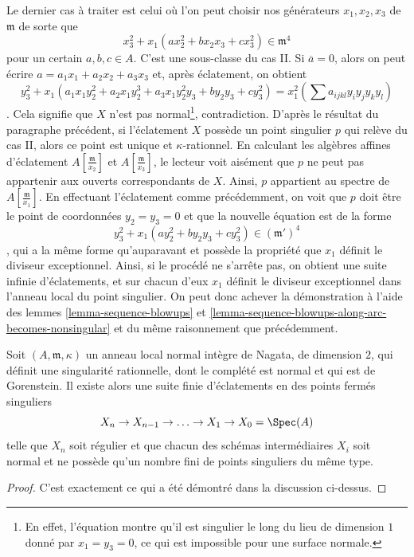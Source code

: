 \medskip\noindent Le dernier cas à traiter est celui où l'on peut choisir nos générateurs $x_1, x_2, x_3$ de $\mathfrak m$ de sorte que $$
x_3^2 + x_1(a x_2^2 + b x_2x_3 + c x_3^2) \in \mathfrak m^4
$$ pour un certain $a, b, c \in A$. C'est une sous-classe du cas II. Si $\overline{a} = 0$, alors on peut écrire $a = a_1 x_1 + a_2 x_2 + a_3 x_3$ et, après éclatement, on obtient $$
y_3^2 + x_1(a_1 x_1 y_2^2 + a_2 x_1 y_2^3 + a_3 x_1 y_2^2 y_3 +
b y_2 y_3 + c y_3^2) = x_1^2 (\sum a_{ijkl}y_iy_jy_ky_l)
$$. Cela signifie que $X$ n'est pas normal\footnote{En effet, l'équation montre qu'il est singulier le long du lieu de dimension $1$ donné par $x_1 = y_3 = 0$, ce qui est impossible pour une surface normale.}, contradiction. D'après le résultat du paragraphe précédent, si l'éclatement $X$ possède un point singulier $p$ qui relève du cas II, alors ce point est unique et $\kappa$-rationnel. En calculant les algèbres affines d'éclatement $A[\frac{\mathfrak m}{x_2}]$ et $A[\frac{\mathfrak m}{x_3}]$, le lecteur voit aisément que $p$ ne peut pas appartenir aux ouverts correspondants de $X$. Ainsi, $p$ appartient au spectre de $A[\frac{\mathfrak m}{x_1}]$. En effectuant l'éclatement comme précédemment, on voit que $p$ doit être le point de coordonnées $y_2 = y_3 = 0$ et que la nouvelle équation est de la forme $$
y_3^2 + x_1(a y_2^2 + b y_2 y_3 + c y_3^2) \in (\mathfrak m')^4
$$, qui a la même forme qu'auparavant et possède la propriété que $x_1$ définit le diviseur exceptionnel. Ainsi, si le procédé ne s'arrête pas, on obtient une suite infinie d'éclatements, et sur chacun d'eux $x_1$ définit le diviseur exceptionnel dans l'anneau local du point singulier. On peut donc achever la démonstration à l'aide des lemmes \ref{lemma-sequence-blowups} et \ref{lemma-sequence-blowups-along-arc-becomes-nonsingular} et du même raisonnement que précédemment.

\begin{lemma} \label{lemma-resolve-rational-double-points} Soit $(A, \mathfrak m, \kappa)$ un anneau local normal intègre de Nagata, de dimension $2$, qui définit une singularité rationnelle, dont le complété est normal et qui est de Gorenstein. Il existe alors une suite finie d'éclatements en des points fermés singuliers $$
X_n \to X_{n - 1} \to \ldots \to X_1 \to X_0 = \Spec(A)
$$ telle que $X_n$ soit régulier et que chacun des schémas intermédiaires $X_i$ soit normal et ne possède qu'un nombre fini de points singuliers du même type. \end{lemma}

\begin{proof} C'est exactement ce qui a été démontré dans la discussion ci-dessus. \end{proof}




